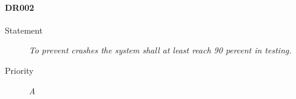 \paragraph{DR002}
  \begin{description}
  \item [Statement] 
    \textit{ To prevent crashes the system shall at least reach 90 percent in testing.}
  \item [Priority] \textit{A}
\end{description}
